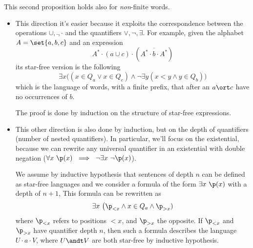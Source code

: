 \documentclass[oneside]{academica}
\begin{document}
This second proposition holds also for \textit{non}-finite words.

\begin{proof*}
  \begin{itemize}
    \item[\color{pink!200}$\Rightarrow$] This direction it's easier because it exploits the correspondence between the operations $\cup, \bar{\ }, \cdot$ and the quantifiers $\lor, \neg, \exists$.
      For example, given the alphabet $A=\set{a,b,c}$ and an expression
      \begin{equation*}
        A^* \cdot (a \cup c) \cdot (\overline{A^* \cdot b \cdot A^*})
      \end{equation*}
      its star-free version is the following
      \begin{equation*}
        \exists x \Big((x \in Q_a \lor x \in Q_c) \land \neg \exists y (x<y \land y \in Q_b)\Big)
      \end{equation*}
      which is the language of words, with a finite prefix, that after an $a \ort c$ have no occurrences of $b$.

      The proof is done by induction on the structure of star-free expressions.
    \item[\color{pink!200}$\Leftarrow$] This other direction is also done by induction, but on the depth of quantifiers (number of nested quantifiers).
      In particular, we'll focus on the existential, because we can rewrite any universal quantifier in an existential with double negation \big($\forall x\ \px\ \implies\ \neg \exists x\ \neg \px$\big).

      We assume by inductive hypothesis that sentences of depth $n$ can be defined as star-free languages and we consider a formula of the form $\exists x \ \px$ with a depth of $n+1$, 
      This formula can be rewritten as
      \begin{equation*}
        \exists x\ \big(\p_{<x} \land x \in Q_a \land \p_{>x})
      \end{equation*}
      where $\p_{<x}$ refers to positions $< x$, and $\p_{>x}$ the opposite.
      If $\p_{<x}$ and $\p_{>x}$ have quantifier depth $n$, then such a formula describes the language $U \cdot a \cdot V$, where $U \andt V$ are both star-free by inductive hypothesis.


\end{itemize}
\end{proof*}
\end{document}
